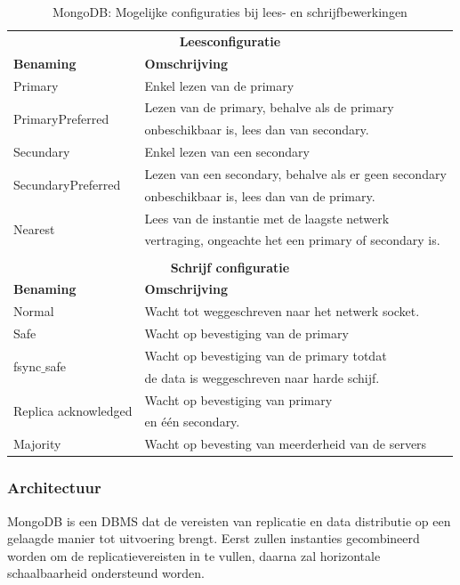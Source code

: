 \begin{table}[ht!]
	\centering
	\begin{tabular}{l|l}
		\multicolumn{2}{c}{\textbf{Leesconfiguratie}} \\ 
		\textbf{Benaming} & \textbf{Omschrijving} \\ \hline
		Primary & Enkel lezen van de primary \\
		\multirow{2}[1]{*}{PrimaryPreferred} & Lezen van de primary, behalve als de primary  \\
		& onbeschikbaar is, lees dan van secondary. \\
		Secundary & Enkel lezen van een secondary \\
		\multirow{2}[1]{*}{SecundaryPreferred} & Lezen van een secondary, behalve als er geen secondary  \\
				& onbeschikbaar is, lees dan van de primary. \\
		\multirow{2}[1]{*}{Nearest} & Lees van de instantie met de laagste netwerk \\
				& vertraging, ongeachte het een primary of secondary is. \\
		\multicolumn{2}{c}{\textbf{}} \\ 		
		
		\multicolumn{2}{c}{\textbf{Schrijf configuratie}} \\ 
		\textbf{Benaming} & \textbf{Omschrijving} \\ \hline
		Normal & Wacht tot weggeschreven naar het netwerk socket. \\
		\multirow{1}[1]{*}{Safe} & Wacht op bevestiging van de primary    \\
		
		\multirow{2}[1]{*}{fsync$\_$safe} & Wacht op bevestiging van de primary totdat  \\
				& de data is weggeschreven naar harde schijf.  \\
		\multirow{2}[1]{*}{Replica acknowledged} & Wacht op bevestiging van primary  \\
				& en één secondary. \\
		\multirow{1}[1]{*}{Majority} & Wacht op bevesting van meerderheid van de servers  \\
	\end{tabular}
	\caption{MongoDB: Mogelijke configuraties bij lees- en schrijfbewerkingen}
	\label{table:mongodb-query-opties}
\end{table}

\subsubsection{Architectuur}
MongoDB is een DBMS dat de vereisten van replicatie en data distributie op een gelaagde manier tot uitvoering brengt. Eerst zullen instanties gecombineerd worden om de replicatievereisten in te vullen, daarna zal horizontale schaalbaarheid ondersteund worden. 

